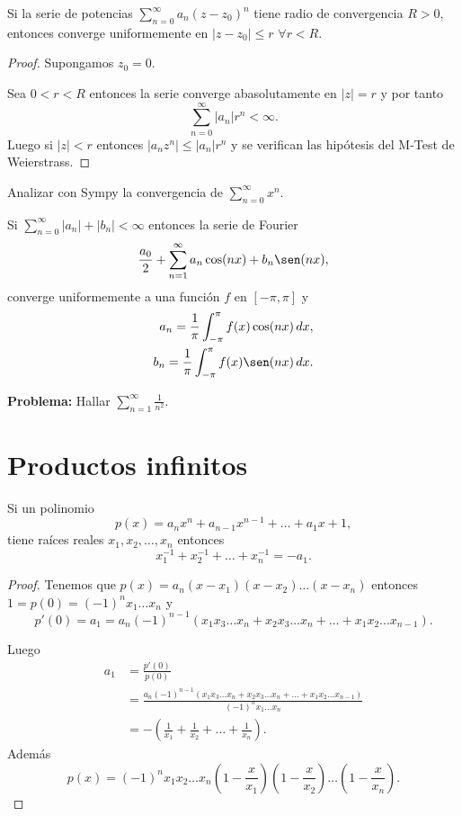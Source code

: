 \begin{corolario}{}
Si la serie de potencias $\sum\limits_{n=0}^{\infty} a_n (z-z_0)^n$ tiene radio de convergencia $R>0$, 
entonces converge uniformemente en $|z-z_0|\leq r$ $\forall r<R$.
\end{corolario}

\begin{proof}
Supongamos $z_0=0$.

Sea $0<r<R$ entonces la serie converge abasolutamente en $|z|=r$ y por tanto 
\[
\sum\limits_{n=0}^{\infty}|a_n|r^n
<\infty.\]
Luego si $|z|<r$ entonces $|a_nz^n|\leq |a_n|r^n$ y se verifican las hipótesis del M-Test de Weierstrass.
\end{proof}

\begin{ejemplo}{}
Analizar con Sympy la convergencia de $\sum\limits_{n=0}^{\infty} x^n$.
\end{ejemplo}

\begin{corolario}{}
Si $\sum\limits_{n=0}^{\infty}|a_n|+|b_n|<\infty$ entonces la serie de Fourier 
\[
\frac{a_0}{2}+\sum\limits_{n=1}^{\infty} a_n \cos(nx)+b_n \sen(nx),
\]
converge uniformemente a una función $f$ en $[-\pi,\pi]$ y 
\[
\begin{split}
a_n=\frac{1}{\pi}\int_{-\pi}^{\pi} f(x)\cos(nx)\,dx,\\
b_n=\frac{1}{\pi}\int_{-\pi}^{\pi} f(x)\sen(nx)\,dx.
\end{split}
\]
\end{corolario}

\textbf{Problema:} Hallar $\sum\limits_{n=1}^{\infty} \frac{1}{n^2}$.


\section{Productos infinitos}

Si un polinomio
\[
p(x)=a_nx^n+a_{n-1}x^{n-1}+\ldots+a_1x+1,
\]
tiene raíces reales $x_1,x_2,\ldots,x_n$ entonces
\[
x_1^{-1}+x_2^{-1}+\ldots+x_n^{-1}=-a_1.
\]

\begin{proof}
Tenemos que $p(x)=a_n(x-x_1)(x-x_2)\ldots(x-x_n)$ entonces $1=p(0)=(-1)^n x_1\ldots x_n$
y \[p'(0)=a_1=a_n (-1)^{n-1}(x_1x_3\ldots x_n+x_2x_3\ldots x_n+\ldots +x_1x_2\ldots x_{n-1}).\]

Luego
\[
\begin{split}
a_1&=\frac{p'(0)}{p(0)}
\\
&=\frac{a_n (-1)^{n-1}(x_1x_3\ldots x_n+x_2x_3\ldots x_n+\ldots +x_1x_2\ldots x_{n-1})}{(-1)^n x_1\ldots x_n}
\\&=
-\left(\frac{1}{x_1}+\frac{1}{x_2}+\ldots+\frac{1}{x_n}\right).
\end{split}
\]
Además 
\[
p(x)=(-1)^n x_1x_2\ldots x_n \left(1-\frac{x}{x_1}\right) \left(1-\frac{x}{x_2}\right)\ldots \left(1-\frac{x}{x_n}\right).
\]
\end{proof}

